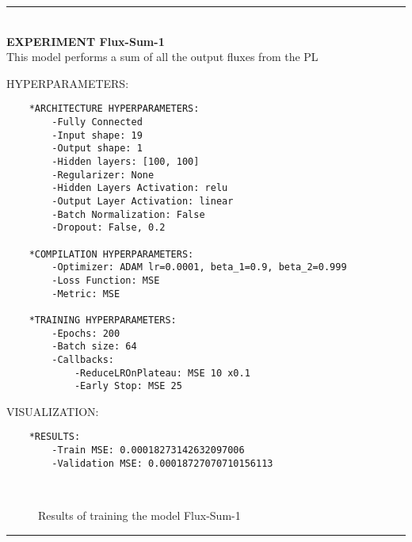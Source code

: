 \rule{0.5\textwidth}{0.5pt}\\

	{\large \textbf{EXPERIMENT Flux-Sum-1}}\\
	
		This model performs a sum of all the output fluxes from the PL
		
	{\normalsize HYPERPARAMETERS:}
	\begin{lstlisting}
	*ARCHITECTURE HYPERPARAMETERS:
		-Fully Connected
		-Input shape: 19
		-Output shape: 1
		-Hidden layers: [100, 100]
		-Regularizer: None
		-Hidden Layers Activation: relu
		-Output Layer Activation: linear
		-Batch Normalization: False
		-Dropout: False, 0.2
	
	*COMPILATION HYPERPARAMETERS:
		-Optimizer: ADAM lr=0.0001, beta_1=0.9, beta_2=0.999
		-Loss Function: MSE
		-Metric: MSE
	
	*TRAINING HYPERPARAMETERS:
		-Epochs: 200
		-Batch size: 64
		-Callbacks: 
			-ReduceLROnPlateau: MSE 10 x0.1
			-Early Stop: MSE 25
	\end{lstlisting}
	
	{\normalsize VISUALIZATION:}
	\begin{lstlisting}
    *RESULTS:
        -Train MSE: 0.00018273142632097006
        -Validation MSE: 0.00018727070710156113
	\end{lstlisting}
	
	\begin{figure*}[ht!]
		\hspace{\fill}
		\hspace{\fill}	
		\\
		\caption{Results of training the model Flux-Sum-1}
	\end{figure*}
	
\FloatBarrier	
\rule{0.5\textwidth}{0.5pt}\\